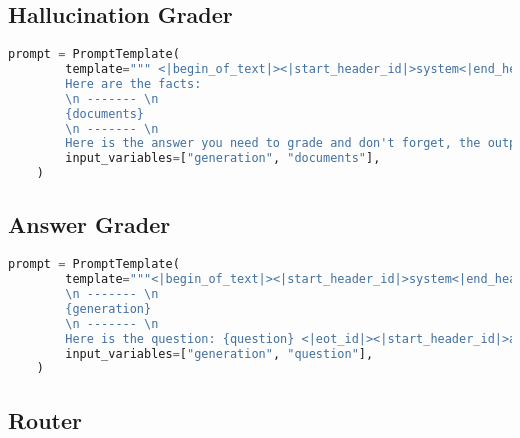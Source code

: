 \subsection{Hallucination Grader}

\begin{lstlisting}[language=Python, caption=\it{Prompt used for the hallucination grader.}]
    prompt = PromptTemplate(
        template=""" <|begin_of_text|><|start_header_id|>system<|end_header_id|> You are a grader assessing whether an answer is grounded in / supported by a set of facts. Give a binary 'yes' or 'no' score to indicate whether the answer is grounded in / supported by a set of facts. Provide the binary score as a JSON with a  single key 'score' and no preamble or explanation. Make sure to exactly output a json with one key 'score' <|eot_id|><|start_header_id|>user<|end_header_id|>
        Here are the facts:
        \n ------- \n
        {documents} 
        \n ------- \n
        Here is the answer you need to grade and don't forget, the output needs to be in json format with one and only one key called score (yes if the answer is grouned to the facts else no): {generation}  <|eot_id|><|start_header_id|>assistant<|end_header_id|>""",
        input_variables=["generation", "documents"],
    )
\end{lstlisting}

\subsection{Answer Grader}

\begin{lstlisting}[language=Python, caption=\it{Prompt used for the hallucination grader.}]
    prompt = PromptTemplate(
        template="""<|begin_of_text|><|start_header_id|>system<|end_header_id|> You are a grader assessing whether an answer is useful to resolve a question. Give a binary score 'yes' or 'no' to indicate whether the answer is useful to resolve a question. Provide the binary score as a JSON with a single key 'score' and no preamble or explanation. <|eot_id|><|start_header_id|>user<|end_header_id|> Here is the answer:
        \n ------- \n
        {generation} 
        \n ------- \n
        Here is the question: {question} <|eot_id|><|start_header_id|>assistant<|end_header_id|>""",
        input_variables=["generation", "question"],
    )
\end{lstlisting}

\clearpage

\subsection{Router}

